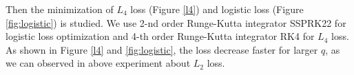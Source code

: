 Then the minimization of $L_4$ loss (Figure \ref{l4}) and logistic loss (Figure \ref{fig:logistic}) is studied. We use 2-nd order Runge-Kutta integrator SSPRK22 for logistic loss optimization and 4-th order Runge-Kutta integrator RK4 for $L_4$ loss. As shown in Figure \ref{l4} and \ref{fig:logistic}, the loss decrease faster for larger $q$, as we can observed in above experiment about $L_2$ loss.